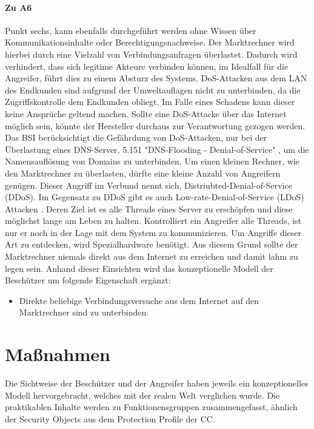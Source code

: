 \documentclass[11pt,a4paper]{report}
\begin{document}
\paragraph{Zu A6} Punkt sechs, kann ebenfalls durchgeführt werden ohne Wissen über Kommunikationsinhalte oder Berechtigungsnachweise. Der Marktrechner wird hierbei durch eine Vielzahl von Verbindungsanfragen überlastet. Dadurch wird verhindert, dass sich legitime Akteure verbinden können, im Idealfall für die Angreifer, führt dies zu einem Absturz des Systems. DoS-Attacken aus dem LAN des Endkunden sind aufgrund der Umweltauflagen nicht zu unterbinden, da die Zugriffskontrolle dem Endkunden obliegt. Im Falle eines Schadens kann dieser keine Ansprüche geltend machen. Sollte eine DoS-Attacke über das Internet möglich sein, könnte der Hersteller durchaus zur Verantwortung gezogen werden. Das BSI berücksichtigt die Gefährdung von DoS-Attacken, nur bei der Überlastung eines DNS-Server, 5.151 "DNS-Flooding - Denial-of-Service" \cite{bsi_g5151}, um die Namensauflösung von Domains zu unterbinden. Um einen kleinen Rechner, wie den Marktrechner zu überlasten, dürfte eine kleine Anzahl von Angreifern genügen. Dieser Angriff im Verbund nennt sich, Distriubted-Denial-of-Service (DDoS). Im Gegensatz zu DDoS gibt es auch Low-rate-Denial-of-Service (LDoS) Attacken \cite[s.~303]{gutmann}. Deren Ziel ist es alle Threads eines Server zu erschöpfen und diese möglichst lange am Leben zu halten. Kontrolliert ein Angreifer alle Threads, ist nur er noch in der Lage mit dem System zu kommunizieren. Um Angriffe dieser Art zu entdecken, wird Spezialhardware benötigt. Aus diesem Grund sollte der Marktrechner niemals direkt aus dem Internet zu erreichen und damit lahm zu legen sein. Anhand dieser Einsichten wird das konzeptionelle Modell der Beschützer um folgende Eigenschaft ergänzt:

\begin{itemize}[leftmargin=*]
\item Direkte beliebige Verbindungsversuche aus dem Internet auf den Marktrechner sind zu unterbinden.
\end{itemize}

\section{Maßnahmen} \label{sec:analysis_measures}

Die Sichtweise der Beschützer und der Angreifer haben jeweils ein konzeptionelles Modell hervorgebracht, welches mit der realen Welt verglichen wurde. Die praktikablen Inhalte werden zu Funktionensgruppen zusammengefasst, ähnlich der Security Objects aus dem Protection Profile der CC.
\end{document}
